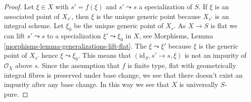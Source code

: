 \documentclass[10pt,a4paper]{amsart}
\theoremstyle{plain}
\theoremstyle{definition}
\theoremstyle{remark}
\numberwithin{equation}{subsection}
\begin{document}
\begin{proof}
Let $\xi \in X$ with $s' = f(\xi)$ and $s' \leadsto s$ a specialization
of $S$. If $\xi$ is an associated point of $X_{s'}$, then $\xi$ is the
unique generic point because $X_{s'}$ is an integral scheme. Let
$\xi_0$ be the unique generic point of $X_s$. As $X \to S$ is flat
we can lift $s' \leadsto s$ to a specialization
$\xi' \leadsto \xi_0$ in $X$, see
Morphisms, Lemma \ref{morphisms-lemma-generalizations-lift-flat}.
The $\xi \leadsto \xi'$ because $\xi$ is the generic point of $X_{s'}$
hence $\xi \leadsto \xi_0$. This means that $(\text{id}_S, s' \to s, \xi)$
is not an impurity of $\mathcal{O}_X$ above $s$. Since the assumption
that $f$ is finite type, flat with geometrically integral fibres
is preserved under base change, we see that there doesn't exist an
impurity after any base change. In this way we see that $X$ is
universally $S$-pure.
\end{proof}
\end{document}
